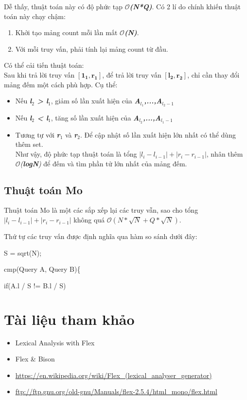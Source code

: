 \documentclass[12pt,a4paper]{article}
\begin{document}
Dễ thấy, thuật toán này có độ phức tạp
$\mathcal{O}$\textit{\textbf{(N*Q)}}. Có 2 lí do chính khiến thuật toán này chạy chậm: 
\begin{enumerate}
\item Khởi tạo mảng count mỗi lần mất $\mathcal{O}$\textit{\textbf{(N)}}.
\item Với mỗi truy vấn, phải tính lại mảng count từ đầu. 
\end{enumerate}
Có thể cải tiến thuật toán: \\
Sau khi trả lời truy vấn $\mathbf{[1_1,r_1]}$, để trả lời truy vấn $\mathbf{[l_2,r_2]}$, chỉ cần thay đổi mảng đếm một cách phù hợp. Cụ thể: 
\begin{itemize}
\item Nếu \textit{\textbf{l$_2$ > l$_1$}}, giảm số lần xuất hiện của \textit{\textbf{A$_{l_1}$,...,A$_{{l_2}-1}$}} 
\item Nếu \textit{\textbf{l$_2$ < l$_1$}}, tăng số lần xuất hiện của \textit{\textbf{A$_{l_2}$,...,A$_{{l_1}-1}$}}
\item Tương tự với \textit{\textbf{r$_1$}} và \textit{\textbf{r$_2$}}.
Để cập nhật số lần xuất hiện lớn nhất có thể dùng thêm set. \\
Như vậy, độ phức tạp thuật toán là tổng $|\mathit{l_i - l_{i-1}}| + |r_{i} - r_{i-1}|$, nhân thêm $\mathbf{\mathcal{O}}$\textit{(\textbf{logN})} để đếm và tìm phần tử lớn nhất của mảng đếm.
\end{itemize}
\subsection{Thuật toán Mo}
Thuật toán Mo là một các sắp xếp lại các truy vẫn, sao cho tổng $|l_i - l_{i-1}| + |r_i - r_{i-1}|$ không quá $\mathcal{O}\mathit{(N*\sqrt{N} + Q*\sqrt{N})}$. \par
Thứ tự các truy vấn được định nghĩa qua hàm so sánh dưới đây: \\[0.5cm] 
\parbox{500pt}{
\ttfamily
\hspace{1cm}S = sqrt(N);\par 
{} {\color{red}cmp}(Query A, Query B)\{ \par 
\hspace{1.5cm} {\color{blue}if}(A.l / S != B.l / S)    	
}
 



\newpage 
\section{Tài liệu tham khảo}
\begin{itemize}
\item \textsf{Lexical Analysis with Flex}
\item \textsf{Flex \& Bison}
\item \href{url}{https://en.wikipedia.org/wiki/Flex\_(lexical\_analyser\_generator)}
\item \href{url}{ftp://ftp.gnu.org/old-gnu/Manuals/flex-2.5.4/html\_mono/flex.html}
\end{itemize}
  
 
\end{document}
